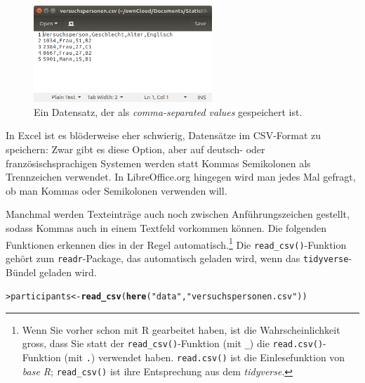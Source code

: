\documentclass[oneside, 10pt]{book}\usepackage[]{graphicx}\usepackage[]{xcolor}
\makeatletter
\newcommand{\hlstr}[1]{\textcolor[rgb]{0.192,0.494,0.8}{#1}}%
\newcommand{\hlstd}[1]{\textcolor[rgb]{0.345,0.345,0.345}{#1}}%
\newcommand{\hlkwb}[1]{\textcolor[rgb]{0.69,0.353,0.396}{#1}}%
\newcommand{\hlkwd}[1]{\textcolor[rgb]{0.737,0.353,0.396}{\textbf{#1}}}%
\newenvironment{kframe}{%
 \def\at@end@of@kframe{}%
 \ifinner\ifhmode%
  \def\at@end@of@kframe{\end{minipage}}%
  \begin{minipage}{\columnwidth}%
 \fi\fi%
 \def\FrameCommand##1{\hskip\@totalleftmargin \hskip-\fboxsep
 \colorbox{shadecolor}{##1}\hskip-\fboxsep
     \hskip-\linewidth \hskip-\@totalleftmargin \hskip\columnwidth}%
 \MakeFramed {\advance\hsize-\width
   \@totalleftmargin\z@ \linewidth\hsize
   \@setminipage}}%
 {\par\unskip\endMakeFramed%
 \at@end@of@kframe}
\newenvironment{knitrout}{}{} %
\makeatother
\begin{document}
\begin{figure}[htp]
\centering
\includegraphics[max width = 0.6\textwidth]{figs/csv.png}
\caption{Ein Datensatz, der als \textit{comma-separated values} gespeichert ist.}
\label{fig:csv}
\end{figure}

In Excel ist es blöderweise eher schwierig, Datensätze im CSV-Format zu speichern:
Zwar gibt es diese Option, aber auf deutsch- oder französischsprachigen Systemen
werden statt Kommas Semikolonen als Trennzeichen verwendet.
In LibreOffice.org hingegen wird man jedes Mal gefragt, ob man Kommas oder Semikolonen
verwenden will.

Manchmal werden Texteinträge auch noch zwischen Anführungszeichen gestellt, sodass
Kommas auch in einem Textfeld vorkommen können. Die folgenden Funktionen erkennen
dies in der Regel automatisch.\footnote{Wenn Sie vorher schon mit R gearbeitet haben, ist die Wahrscheinlichkeit gross, dass Sie statt der \texttt{read\_csv()}-Funktion (mit \texttt{\_}) die \texttt{read.csv()}-Funktion (mit \texttt{.}) verwendet haben.
\texttt{read.csv()} ist die Einlesefunktion von \textit{base R};
\texttt{read\_csv()} ist ihre Entsprechung aus dem \textit{tidyverse}.}
Die \texttt{read\_csv()}-Funktion gehört zum \texttt{readr}-Package,
das automatisch geladen wird, wenn das \texttt{tidyverse}-Bündel geladen wird.

\begin{knitrout}
\color{fgcolor}\begin{kframe}
\begin{alltt}
\hlstd{> }\hlstd{participants} \hlkwb{<-} \hlkwd{read_csv}\hlstd{(}\hlkwd{here}\hlstd{(}\hlstr{"data"}\hlstd{,} \hlstr{"versuchspersonen.csv"}\hlstd{))}
\end{alltt}


{\ttfamily\noindent\itshape{}}\end{kframe}
\end{knitrout}
\end{document}

